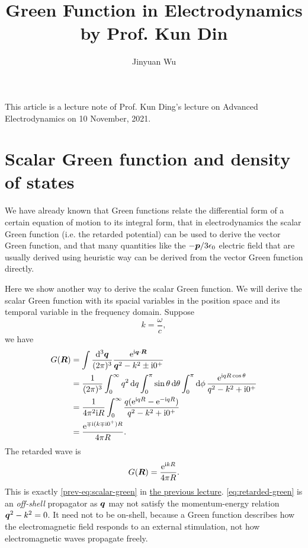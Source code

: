 \documentclass[hyperref, a4paper]{article}
\title{Green Function in Electrodynamics by Prof. Kun Din}
\author{Jinyuan Wu}
\newcommand*{\ii}{\mathrm{i}}
\newcommand*{\ee}{\mathrm{e}}
\newcommand{\prevdoc}{\href{./lecture-11-3}{the previous lecture}}
\begin{document}
\maketitle

This article is a lecture note of Prof. Kun Ding's lecture on Advanced Electrodynamics on 10 November, 2021.

\section{Scalar Green function and density of states}

We have already known that Green functions relate the differential form of a certain equation of motion to its
integral form, that in electrodynamics the scalar Green function (i.e. the retarded potential) can be used to
derive the vector Green function, and that many quantities like the $- \vb*{p} / 3\epsilon_0$ electric field 
that are usually derived using heuristic way can be derived from the vector Green function directly.

Here we show another way to derive the scalar Green function. We will derive the scalar Green function with its spacial variables in the position space and its temporal variable in the frequency domain.
Suppose
\begin{equation}
    k = \frac{\omega}{c},
\end{equation}
we have 
\[
    \begin{aligned}
        G(\vb*{R}) &= \int \frac{\dd[3]{\vb*{q}}}{(2\pi)^3} \frac{\ee^{\ii \vb*{q} \cdot \vb*{R}}}{{\vb*{q}}^2 - k^2 \pm \ii 0^+} \\
        &= \frac{1}{(2\pi)^3} \int_0^\infty q^2 \dd{q} \int_0^\pi \sin \theta \dd{\theta} \int_0^\pi \dd{\phi}
        \frac{\ee^{\ii q R \cos \theta}}{q^2 - k^2 + \ii 0^+} \\
        &= \frac{1}{4 \pi^2 \ii R} \int_0^\infty \frac{q (\ee^{\ii q R} - \ee^{- \ii q R})}{q^2 - k^2 + \ii 0^+} \\
        &= \frac{\ee^{\mp \ii (k \mp \ii 0^+) R}}{4 \pi R}.
    \end{aligned}
\]
The retarded wave is 
\begin{equation}
    G(\vb*{R}) = \frac{\ee^{\ii k R}}{4 \pi R}.
    \label{eq:retarded-green}
\end{equation}
This is exactly \eqref{prev-eq:scalar-green} in \prevdoc.
\eqref{eq:retarded-green} is an \emph{off-shell} propagator as $\vb*{q}$ may not satisfy the 
momentum-energy relation $\vb*{q}^2 - k^2 = 0$. It need not to be on-shell, because a Green function 
describes how the electromagnetic field responds to an external stimulation, not how electromagnetic
waves propagate freely.
\end{document}
